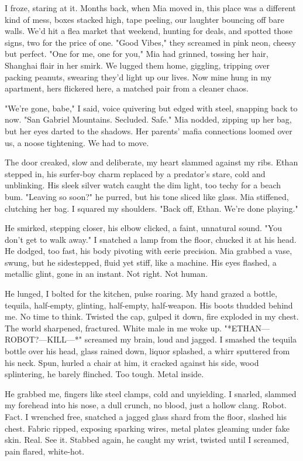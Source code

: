\documentclass{article}
\begin{document}
I froze, staring at it. Months back, when Mia moved in, this place was a different kind of mess, boxes stacked high, tape peeling, our laughter bouncing off bare walls. We'd hit a flea market that weekend, hunting for deals, and spotted those signs, two for the price of one. "Good Vibes," they screamed in pink neon, cheesy but perfect. "One for me, one for you," Mia had grinned, tossing her hair, Shanghai flair in her smirk. We lugged them home, giggling, tripping over packing peanuts, swearing they'd light up our lives. Now mine hung in my apartment, hers flickered here, a matched pair from a cleaner chaos.

"We're gone, babe," I said, voice quivering but edged with steel, snapping back to now. "San Gabriel Mountains. Secluded. Safe." Mia nodded, zipping up her bag, but her eyes darted to the shadows. Her parents' mafia connections loomed over us, a noose tightening. We had to move.

The door creaked, slow and deliberate, my heart slammed against my ribs. Ethan stepped in, his surfer-boy charm replaced by a predator's stare, cold and unblinking. His sleek silver watch caught the dim light, too techy for a beach bum. "Leaving so soon?" he purred, but his tone sliced like glass. Mia stiffened, clutching her bag. I squared my shoulders. "Back off, Ethan. We're done playing."

He smirked, stepping closer, his elbow clicked, a faint, unnatural sound. "You don't get to walk away." I snatched a lamp from the floor, chucked it at his head. He dodged, too fast, his body pivoting with eerie precision. Mia grabbed a vase, swung, but he sidestepped, fluid yet stiff, like a machine. His eyes flashed, a metallic glint, gone in an instant. Not right. Not human.

He lunged, I bolted for the kitchen, pulse roaring. My hand grazed a bottle, tequila, half-empty, glinting, half-empty, half-weapon. His boots thudded behind me. No time to think. Twisted the cap, gulped it down, fire exploded in my chest. The world sharpened, fractured. White male in me woke up. "*ETHAN—ROBOT?—KILL—*" screamed my brain, loud and jagged. I smashed the tequila bottle over his head, glass rained down, liquor splashed, a whirr sputtered from his neck. Spun, hurled a chair at him, it cracked against his side, wood splintering, he barely flinched. Too tough. Metal inside.

He grabbed me, fingers like steel clamps, cold and unyielding. I snarled, slammed my forehead into his nose, a dull crunch, no blood, just a hollow clang. Robot. Fact. I wrenched free, snatched a jagged glass shard from the floor, slashed his chest. Fabric ripped, exposing sparking wires, metal plates gleaming under fake skin. Real. See it. Stabbed again, he caught my wrist, twisted until I screamed, pain flared, white-hot.
\end{document}
